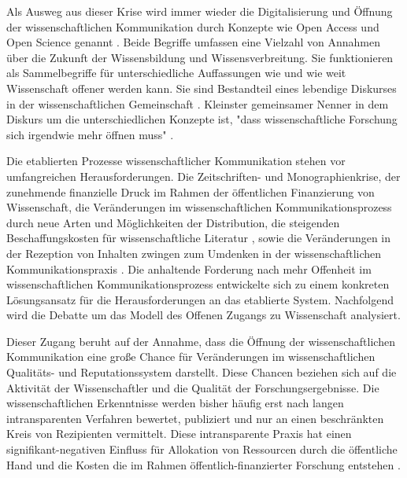 Als Ausweg aus dieser Krise wird immer wieder die Digitalisierung und Öffnung der wissenschaftlichen Kommunikation durch Konzepte wie Open Access und Open Science genannt \cite{lewis_2015_future}. Beide Begriffe umfassen eine Vielzahl von Annahmen über die Zukunft der Wissensbildung und Wissensverbreitung. Sie funktionieren als Sammelbegriffe für unterschiedliche Auffassungen wie und wie weit Wissenschaft offener werden kann. Sie sind Bestandteil eines lebendige Diskurses in der wissenschaftlichen Gemeinschaft \cite{schulze_2013_open}. Kleinster gemeinsamer Nenner in dem Diskurs um die unterschiedlichen Konzepte ist, "dass wissenschaftliche Forschung sich irgendwie mehr öffnen muss" \cite{cite:9}.

Die etablierten Prozesse wissenschaftlicher Kommunikation stehen vor umfangreichen Herausforderungen. Die Zeitschriften- und Monographienkrise, der zunehmende finanzielle Druck im Rahmen der öffentlichen Finanzierung von Wissenschaft, die Veränderungen im wissenschaftlichen Kommunikationsprozess durch neue Arten und Möglichkeiten der Distribution, die steigenden Beschaffungskosten für wissenschaftliche Literatur \cite{cite:17} \cite{muller_2010_open}, sowie die Veränderungen in der Rezeption von Inhalten \cite{holub_2013_reception} zwingen zum Umdenken in der wissenschaftlichen Kommunikationspraxis \cite{suchen}. Die anhaltende Forderung nach mehr Offenheit im wissenschaftlichen Kommunikationsprozess entwickelte sich zu einem konkreten Lösungsansatz für die Herausforderungen an das etablierte System. Nachfolgend wird die Debatte um das Modell des Offenen Zugangs zu Wissenschaft analysiert.

Dieser Zugang beruht auf der Annahme, dass die Öffnung der wissenschaftlichen Kommunikation eine große Chance für Veränderungen im wissenschaftlichen Qualitäts- und Reputationssystem darstellt. Diese Chancen beziehen sich auf die Aktivität der Wissenschaftler und die Qualität der Forschungsergebnisse. Die wissenschaftlichen Erkenntnisse werden bisher häufig erst nach langen intransparenten Verfahren bewertet, publiziert und nur an einen beschränkten Kreis von Rezipienten vermittelt. Diese intransparente Praxis hat einen signifikant-negativen Einfluss für Allokation von Ressourcen durch die öffentliche Hand und die Kosten die im Rahmen öffentlich-finanzierter Forschung entstehen \cite{suchen}.

